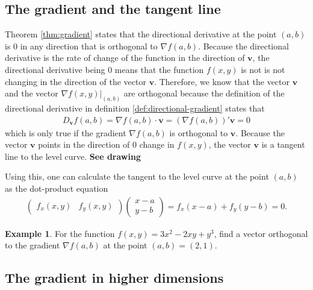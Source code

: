 \documentclass[
]{book}
\theoremstyle{definition}
\theoremstyle{definition}
\newtheorem{example}{Example}[chapter]
\theoremstyle{definition}
\theoremstyle{definition}
\theoremstyle{remark}
\begin{document}
\hypertarget{the-gradient-and-the-tangent-line}{%
\subsection{The gradient and the tangent line}\label{the-gradient-and-the-tangent-line}}

Theorem \ref{thm:gradient} states that the directional derivative at the point \((a, b)\) is 0 in any direction that is orthogonal to \(\nabla f(a, b)\). Because the directional derivative is the rate of change of the function in the direction of \(\mathbf{v}\), the directional derivative being 0 means that the function \(f(x, y)\) is not is not changing in the direction of the vector \(\mathbf{v}\). Therefore, we know that the vector \(\mathbf{v}\) and the vector \(\nabla f(x, y)|_{(a,b)}\) are orthogonal because the definition of the directional derivative in definition \ref{def:directional-gradient} states that
\[
\begin{aligned}
D_{\mathbf{v}} f(a, b)  = \nabla f(a, b) \cdot \mathbf{v} = \left(\nabla f(a, b) \right)'  \mathbf{v} = 0
\end{aligned}
\]
which is only true if the gradient \(\nabla f(a, b)\) is orthogonal to \(\mathbf{v}\). Because the vector \(\mathbf{v}\) points in the direction of 0 change in \(f(x,y)\), the vector \(\mathbf{v}\) is a tangent line to the level curve. \textbf{See drawing}

Using this, one can calculate the tangent to the level curve at the point \((a, b)\) as the dot-product equation
\[
\begin{aligned}
\begin{pmatrix} f_x(x, y) & f_y(x, y) \end{pmatrix} \begin{pmatrix} x - a \\ y - b \end{pmatrix} =  f_x (x-a) + f_y (y-b) = 0.
\end{aligned}
\]

\begin{example}
For the function \(f(x, y) = 3x^2 - 2xy + y^3\), find a vector orthogonal to the gradient \(\nabla f(a, b)\) at the point \((a, b) = (2, 1)\).
\end{example}

\hypertarget{the-gradient-in-higher-dimensions}{%
\subsection{The gradient in higher dimensions}\label{the-gradient-in-higher-dimensions}}
\end{document}
